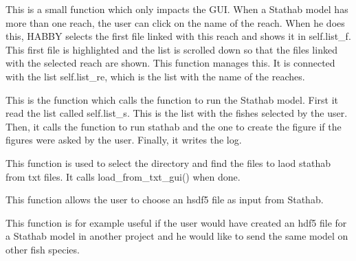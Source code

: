 \documentclass[letterpaper,10pt,english]{sphinxmanual}
\begin{document}
\begin{fulllineitems}
\begin{fulllineitems}

This is a small function which only impacts the GUI. When a Stathab model has more than one reach,
the user can click on the name of the reach. When he does this, HABBY selects the first file linked
with this reach and shows it in self.list\_f. This first file is highlighted and the list is scrolled
down so that the files linked with the selected reach are shown. This function manages this. It is connected
with the list self.list\_re, which is the list with the name of the reaches.

\end{fulllineitems}


\begin{fulllineitems}
\label{\detokenize{index:src_GUI.stathab_GUI.StathabW.run_stathab_gui}}
This is the function which calls the function to run the Stathab model.  First it read the list called
self.list\_s. This is the list with the fishes selected by the user. Then, it calls the function to run
stathab and the one to create the figure if the figures were asked by the user. Finally, it writes the log.

\end{fulllineitems}


\begin{fulllineitems}
\label{\detokenize{index:src_GUI.stathab_GUI.StathabW.select_dir}}
This function is used to select the directory and find the files to laod stathab from txt files. It calls
load\_from\_txt\_gui() when done.

\end{fulllineitems}


\begin{fulllineitems}
\label{\detokenize{index:src_GUI.stathab_GUI.StathabW.select_hdf5}}
This function allows the user to choose an hsdf5 file as input from Stathab.


This function is for example useful if the user would have created an hdf5 file for a Stathab model in another
project and he would like to send the same model on other fish species.


\end{fulllineitems}
\end{fulllineitems}
\end{document}
